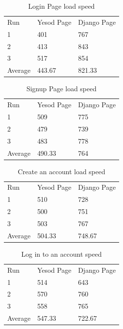\begin{table}[H]
	\caption{Login Page load speed}
	\begin{center}
		\begin{tabular}{ | l | l | l |}
			\hline
			Run  & Yesod Page & Django Page \\
			1 & 401 & 767 \\
			2 & 413 & 843 \\
			3 & 517 & 854 \\
			Average & 443.67 & 821.33 \\
			\hline
		\end{tabular}
	\end{center}
	\label{tab:loginLoadSpeeds}
\end{table}

\begin{table}[H]
	\caption{Signup Page load speed}
	\begin{center}
		\begin{tabular}{ | l | l | l |}
			\hline
			Run & Yesod Page & Django Page \\
			1 & 509 & 775 \\
			2 & 479 & 739 \\
			3 & 483 & 778 \\
			Average & 490.33 & 764 \\
			\hline
		\end{tabular}
	\end{center}
	\label{tab:signupLoadSpeeds}
\end{table}

\begin{table}[H]
	\caption{Create an account load speed}
	\begin{center}
		\begin{tabular}{ | l | l | l |}
			\hline
			Run & Yesod Page & Django Page \\
			1 & 510 & 728 \\
			2 & 500 & 751 \\
			3 & 503 & 767 \\
			Average & 504.33 & 748.67 \\
			\hline
		\end{tabular}
	\end{center}
	\label{tab:signupCreateLoadSpeeds}
\end{table}

\begin{table}[H]
	\caption{Log in to an account speed}
	\begin{center}
		\begin{tabular}{ | l | l | l |}
			\hline
			Run & Yesod Page & Django Page \\
			1 & 514 & 643 \\
			2 & 570 & 760 \\
			3 & 558 & 765 \\
			Average & 547.33 & 722.67 \\
			\hline
		\end{tabular}
	\end{center}
	\label{tab:loginLoginLoadSpeeds}
\end{table}

